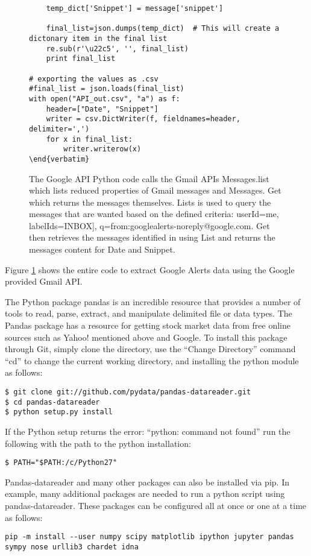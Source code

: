 \documentclass[sigconf]{acmart}
\begin{document}
\begin{figure}[htb]
\begin{lstlisting}
    temp_dict['Snippet'] = message['snippet']

    final_list=json.dumps(temp_dict)  # This will create a dictonary item in the final list
    re.sub(r'\u22c5', '', final_list)
    print final_list

# exporting the values as .csv
#final_list = json.loads(final_list)
with open("API_out.csv", "a") as f:
    header=["Date", "Snippet"]
    writer = csv.DictWriter(f, fieldnames=header, delimiter=',')
    for x in final_list:
        writer.writerow(x)
\end{verbatim}
\end{lstlisting}
\caption{The Google API Python code calls the Gmail APIs Messages.list which lists reduced properties of Gmail messages and Messages. Get which returns the messages themselves. Lists is used to query the messages that are wanted based on the defined criteria: userId=me, labelIds=INBOX], q=from:googlealerts-noreply@google.com. Get then retrieves the messages identified in using List and returns the messages content for Date and Snippet.}\label{c:googleapi}
\end{figure}

Figure \ref{c:googleapi} shows the entire code to extract Google Alerts data using the Google provided Gmail API.


The Python package pandas is an incredible resource that provides a number of tools to read, parse, extract, and manipulate delimited file or data types. The Pandas package has a resource for getting stock market data from free online sources such as Yahoo! mentioned above and Google. To install this package through Git, simply clone the directory, use the ``Change Directory'' command ``cd'' to change the current working directory, and installing the python module as follows: 
\begin{lstlisting}
$ git clone git://github.com/pydata/pandas-datareader.git
$ cd pandas-datareader
$ python setup.py install
\end{lstlisting}


If the Python setup returns the error: ``python: command not found'' run the following with the path to the python installation:

\begin{lstlisting}
$ PATH="$PATH:/c/Python27"
\end{lstlisting}

Pandas-datareader and many other packages can also be installed via pip. In example, many additional packages are needed to run a python script using pandas-datareader. These packages can be configured all at once or one at a time as follows:
\begin{lstlisting}
pip -m install --user numpy scipy matplotlib ipython jupyter pandas sympy nose urllib3 chardet idna
\end{lstlisting}
\end{document}
